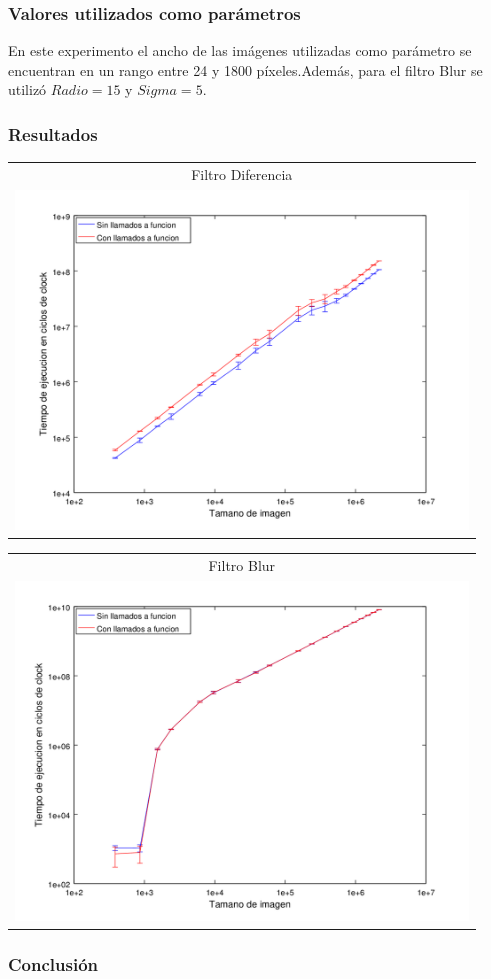 		\subsubsection{Valores utilizados como parámetros} 
			En este experimento el ancho de las imágenes utilizadas como parámetro se encuentran en un rango entre 24 y 1800 píxeles.Además, para el filtro Blur se utilizó $Radio = 15$ y $Sigma = 5$.


		\subsubsection{Resultados}
		{\centering \begin{tabular}{c}
      		{\small Filtro Diferencia} \\
      		\includegraphics[width=12cm]{../exp/graficos/exp4-diff-c_vs_c2.png} \\
    	\end{tabular}}

		{\centering \begin{tabular}{c}
      		{\small Filtro Blur} \\
      		\includegraphics[width=12cm]{../exp/graficos/exp4-blur-asm_vs_asm2.png} \\
    	\end{tabular}}

		\subsubsection{Conclusión}		